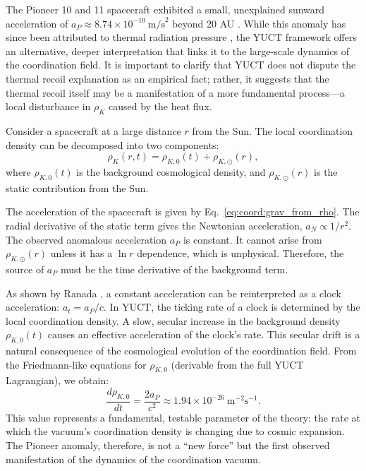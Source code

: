 \documentclass[12pt,a4paper]{article}
\theoremstyle{remark}
\begin{document}
	The Pioneer 10 and 11 spacecraft exhibited a small, unexplained sunward acceleration of \(a_P \approx 8.74 \times 10^{-10}\ \text{m/s}^2\) beyond 20 AU \cite{Anderson1998}. While this anomaly has since been attributed to thermal radiation pressure \cite{Turyshev2012}, the YUCT framework offers an alternative, deeper interpretation that links it to the large-scale dynamics of the coordination field. It is important to clarify that YUCT does not dispute the thermal recoil explanation as an empirical fact; rather, it suggests that the thermal recoil itself may be a manifestation of a more fundamental process—a local disturbance in \(\rho_K\) caused by the heat flux.
	
	Consider a spacecraft at a large distance \(r\) from the Sun. The local coordination density can be decomposed into two components:
	\begin{equation}
		\rho_K(r,t) = \rho_{K,0}(t) + \rho_{K,\odot}(r),
		\label{eq:coord:rho_decomp}
	\end{equation}
	where \(\rho_{K,0}(t)\) is the background cosmological density, and \(\rho_{K,\odot}(r)\) is the static contribution from the Sun.
	
	The acceleration of the spacecraft is given by Eq.~\eqref{eq:coord:grav_from_rho}. The radial derivative of the static term gives the Newtonian acceleration, \(a_N \propto 1/r^2\). The observed anomalous acceleration \(a_P\) is constant. It cannot arise from \(\rho_{K,\odot}(r)\) unless it has a \(\ln r\) dependence, which is unphysical. Therefore, the source of \(a_P\) must be the time derivative of the background term.
	
	As shown by Ranada \cite{Ranada2005}, a constant acceleration can be reinterpreted as a clock acceleration: \(a_t = a_P / c\). In YUCT, the ticking rate of a clock is determined by the local coordination density. A slow, secular increase in the background density \(\rho_{K,0}(t)\) causes an effective acceleration of the clock's rate. This secular drift is a natural consequence of the cosmological evolution of the coordination field. From the Friedmann-like equations for \(\rho_{K,0}\) (derivable from the full YUCT Lagrangian), we obtain:
	\begin{equation}
		\frac{d\rho_{K,0}}{dt} = \frac{2a_P}{c^2} \approx 1.94 \times 10^{-26}\ \text{m}^{-2}\text{s}^{-1}.
		\label{eq:coord:rho_dot}
	\end{equation}
	This value represents a fundamental, testable parameter of the theory: the rate at which the vacuum's coordination density is changing due to cosmic expansion. The Pioneer anomaly, therefore, is not a ``new force'' but the first observed manifestation of the dynamics of the coordination vacuum.
	
\end{document}

